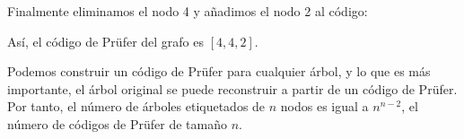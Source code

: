 Finalmente eliminamos el nodo 4 y añadimos el nodo 2 al código:
\begin{center}
\end{center}

Así, el código de Prüfer del grafo es $[4,4,2]$.

Podemos construir un código de Prüfer para cualquier árbol,
y lo que es más importante,
el árbol original se puede reconstruir
a partir de un código de Prüfer.
Por tanto, el número de árboles etiquetados
de $n$ nodos es igual a
$n^{n-2}$, el número de códigos de Prüfer
de tamaño $n$.
